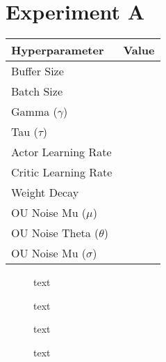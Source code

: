 \section{Experiment A}

\begin{minipage}{0.45\textwidth}
	\centering
	\begin{tabular}{lr}
	\toprule
	\textbf{Hyperparameter} & \textbf{Value} \\
	\midrule
	Buffer Size & \\
	Batch Size & \\
	Gamma ($\gamma$) & \\
	Tau ($\tau$) & \\
	Actor Learning Rate & \\
	Critic Learning Rate & \\
	Weight Decay & \\
	OU Noise Mu ($\mu$) & \\
	OU Noise Theta ($\theta$) & \\
	OU Noise Mu ($\sigma$) & \\
	\bottomrule
	\end{tabular}
\end{minipage}
\hspace{1cm}
\begin{minipage}{0.45\textwidth}
	\centering
\end{minipage}

\begin{figure}[h]
	\begin{minipage}{0.45\textwidth}
		\centering
		
		\caption{text}
		\label{fig:5101_raw_reward}
	\end{minipage}
	\hspace{0.75cm}
	\begin{minipage}{0.45\textwidth}
		\centering
		
		\caption{text}
		\label{fig:5102_average_reward}
	\end{minipage}
\end{figure}

\begin{figure}[h]
	\begin{minipage}{0.45\textwidth}
		\centering
		
		\caption{text}
		\label{fig:5103_frequency_response_1}
	\end{minipage}
	\hspace{0.75cm}
	\begin{minipage}{0.45\textwidth}
		\centering
		
		\caption{text}
		\label{fig:5104_frequency_response_2}
	\end{minipage}
\end{figure}

